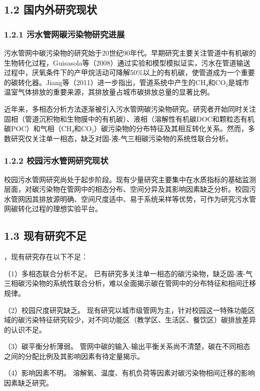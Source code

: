 \documentclass[12pt]{article}
\begin{document}
\subsection{1.2 国内外研究现状}

\subsubsection{1.2.1 污水管网碳污染物研究进展}

污水管网中碳污染物的研究始于20世纪90年代。早期研究主要关注管道中有机碳的生物转化过程，Guisasola等（2008）通过实验和模型模拟证实，污水在管道输送过程中，厌氧条件下的产甲烷活动可降解50\%以上的有机碳，使管道成为一个重要的碳转化器。Jiang等（2011）进一步指出，管道系统中产生的CH₄和CO₂是城市温室气体排放的重要来源，其排放量占城市碳排放总量的显著比例。

近年来，多相态分析方法逐渐被引入污水管网碳污染物研究。研究者开始同时关注固相（管道沉积物和生物膜中的有机碳）、液相（溶解性有机碳DOC和颗粒态有机碳POC）和气相（CH₄和CO₂）碳污染物的分布特征及其相互转化关系。然而，多数研究仅关注单一相态，缺乏对固-液-气三相碳污染物的系统性联合分析。

\subsubsection{1.2.2 校园污水管网研究现状}

校园污水管网研究尚处于起步阶段。现有少量研究主要集中在水质指标的基础监测层面，对碳污染物在管网中的相态分布、空间分异及其影响因素缺乏分析。校园污水管网因其排放源明确、空间尺度适中、易于系统采样等优势，可作为研究污水管网碳转化过程的理想实验平台。

\subsection{1.3 现有研究不足}

，现有研究存在以下不足：

（1）多相态联合分析不足。 已有研究多关注单一相态的碳污染物，缺乏固-液-气三相碳污染物的系统性联合分析，难以全面揭示碳在管网中的分布特征和相间迁移规律。

（2）校园尺度研究缺乏。 现有研究以城市级管网为主，针对校园这一特殊功能区域的碳污染特征研究较少，对不同功能区（教学区、生活区、餐饮区）碳排放差异的认识不足。

（3）碳平衡分析薄弱。 管网中碳的输入-输出平衡关系尚不清楚，碳在不同相态之间的分配比例及其影响因素有待定量揭示。

（4）影响因素不明。 溶解氧、温度、有机负荷等因素对碳污染物相间迁移的影响因素缺乏研究。
\end{document}
